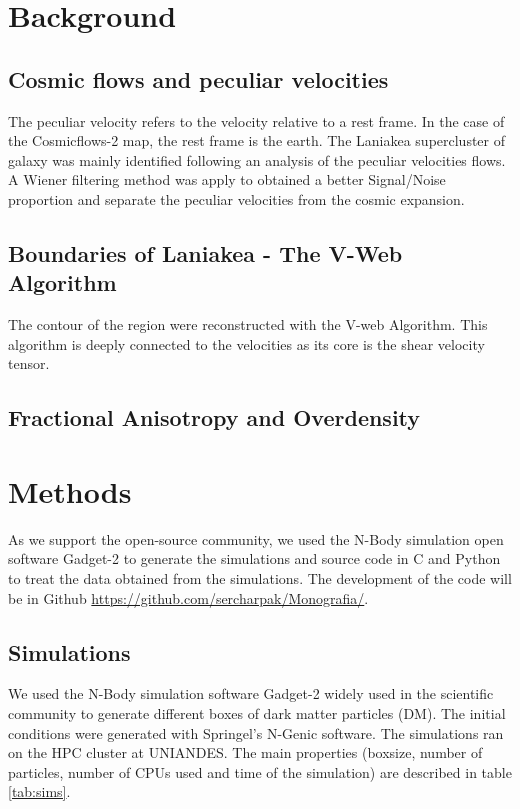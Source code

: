 \documentclass[12pt]{article}
\begin{document}
\section{Background}
\subsection{Cosmic flows and peculiar velocities}
The peculiar velocity refers to the velocity relative to a rest frame. In the case of the
Cosmicflows-2 map, the rest frame is the earth. 
The Laniakea supercluster of galaxy was mainly identified following an analysis of the
peculiar velocities flows. A Wiener filtering method was apply to obtained a better
Signal/Noise proportion and separate the peculiar velocities from the cosmic expansion.\\




\subsection{Boundaries of Laniakea - The V-Web Algorithm}
\label{sec:v_web}
The contour of the region were reconstructed with
 the V-web Algorithm. This algorithm is deeply
  connected to the velocities as its core is the
   shear velocity tensor.\\



\subsection{Fractional Anisotropy and Overdensity}
\label{sec:FA_trace}
\section{Methods}

As we support the open-source community, we used the N-Body simulation open
software Gadget-2 \cite{springel_gadget_2_2005} to generate the simulations
and source code in C and Python to treat the data obtained from the
simulations. The development of the code will be in Github \url{https://github.com/sercharpak/Monografia/}.

\subsection{Simulations}
We used the N-Body simulation software Gadget-2
 \cite{springel_gadget_2_2005}
widely used in the scientific community to
 generate different boxes of dark matter particles
  (DM). The initial conditions were
generated with Springel's N-Genic software. The
 simulations ran on the HPC cluster at UNIANDES.
  The main properties (boxsize, number of
   particles, number of CPUs used and time of the
    simulation) are described in table
     \ref{tab:sims}. \\
\end{document}
